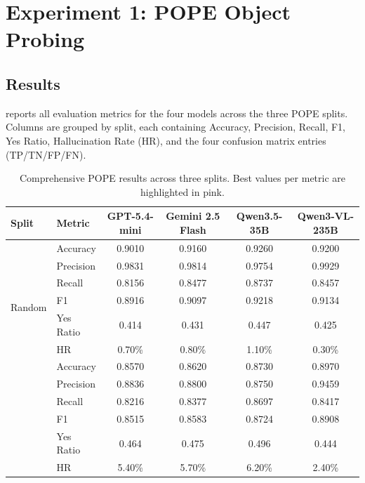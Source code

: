 \section{Experiment 1: POPE Object Probing}

\subsection{Results}

 reports all evaluation metrics
for the four models across the three POPE splits.
Columns are grouped by split,
each containing Accuracy, Precision, Recall, F1, Yes Ratio,
Hallucination Rate (HR),
and the four confusion matrix entries (TP/TN/FP/FN).

\begin{table}[htbp]
  \centering
  \caption{Comprehensive POPE results across three splits.
    Best values per metric are highlighted in pink.}
  \label{tab:pope_results}
  \small
  \setlength{\tabcolsep}{4pt}
  \begin{tabular}{ll cccc}
    \toprule
    Split & Metric
      & GPT-5.4-mini & Gemini 2.5 Flash & Qwen3.5-35B & Qwen3-VL-235B \\
    \midrule
    \multirow{7}{*}{Random}
      & Accuracy  & 0.9010 & 0.9160 & \cellcolor{pink!25}0.9260 & 0.9200 \\
      & Precision & 0.9831 & 0.9814 & 0.9754 & \cellcolor{pink!25}0.9929 \\
      & Recall    & 0.8156 & 0.8477 & \cellcolor{pink!25}0.8737 & 0.8457 \\
      & F1        & 0.8916 & 0.9097 & \cellcolor{pink!25}0.9218 & 0.9134 \\
      & Yes Ratio & 0.414  & 0.431  & 0.447  & 0.425 \\
      & HR        & 0.70\% & 0.80\% & 1.10\% & \cellcolor{pink!25}0.30\% \\
    \midrule
    \multirow{7}{*}{Popular}
      & Accuracy  & 0.8570 & 0.8620 & 0.8730 & \cellcolor{pink!25}0.8970 \\
      & Precision & 0.8836 & 0.8800 & 0.8750 & \cellcolor{pink!25}0.9459 \\
      & Recall    & 0.8216 & 0.8377 & \cellcolor{pink!25}0.8697 & 0.8417 \\
      & F1        & 0.8515 & 0.8583 & 0.8724 & \cellcolor{pink!25}0.8908 \\
      & Yes Ratio & 0.464  & 0.475  & 0.496  & 0.444 \\
      & HR        & 5.40\% & 5.70\% & 6.20\% & \cellcolor{pink!25}2.40\% \\

\end{tabular}
\end{table}
